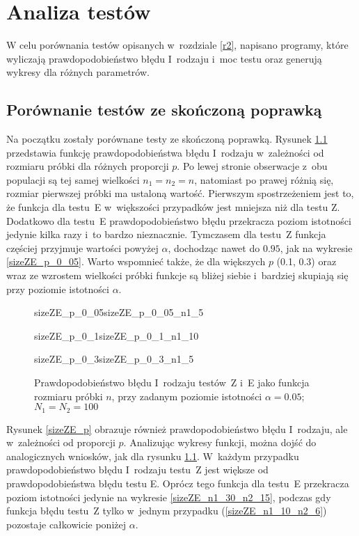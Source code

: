 \chapter{Analiza testów}
\label{r3}

W celu porównania testów opisanych w~rozdziale \ref{r2}, napisano programy, które wyliczają prawdopodobieństwo błędu I~rodzaju i~moc testu oraz generują wykresy dla różnych parametrów.

\section{Porównanie testów ze skończoną poprawką}
\label{r3:skonczonetesty}
Na początku zostały porównane testy ze skończoną poprawką. Rysunek \ref{sizeZE_n} przedstawia funkcję prawdopodobieństwa błędu I~rodzaju w~zależności od rozmiaru próbki dla różnych proporcji $p$. Po lewej stronie obserwacje z~obu populacji są tej samej wielkości $n_1=n_2=n$, natomiast po prawej różnią się, rozmiar pierwszej próbki ma ustaloną wartość. Pierwszym spostrzeżeniem jest to, że funkcja dla testu~E w~większości przypadków jest mniejsza niż dla testu Z. Dodatkowo dla testu~E prawdopodobieństwo błędu przekracza poziom istotności jedynie kilka razy i~to bardzo nieznacznie. Tymczasem dla testu~Z funkcja częściej przyjmuje wartości powyżej $\alpha$, dochodząc nawet do $0.95$, jak na wykresie \ref{sizeZE_p_0_05}. Warto wspomnieć także, że dla większych $p$ (0.1, 0.3) oraz wraz ze wzrostem wielkości próbki funkcje są bliżej siebie i~bardziej skupiają się przy poziomie istotności $\alpha$.

\begin{figure}[!h]
	\begin{subdiagrams}{sizeZE_p_0_05}{sizeZE_p_0_05_n1_5}
	\end{subdiagrams}
	
	\begin{subdiagrams}{sizeZE_p_0_1}{sizeZE_p_0_1_n1_10}
	\end{subdiagrams}
	
	\begin{subdiagrams}{sizeZE_p_0_3}{sizeZE_p_0_3_n1_5}
	\end{subdiagrams}
	\caption{Prawdopodobieństwo błędu I~rodzaju testów~Z i~E jako funkcja rozmiaru próbki $n$, przy zadanym poziomie istotności $\alpha=0.05$; $N_1=N_2=100$}
	\label{sizeZE_n}
\end{figure}

Rysunek \ref{sizeZE_p} obrazuje również prawdopodobieństwo błędu I~rodzaju, ale w~zależności od proporcji $p$. Analizując wykresy funkcji, można dojść do analogicznych wniosków, jak dla rysunku \ref{sizeZE_n}. W~każdym przypadku prawdopodobieństwo błędu I~rodzaju testu~Z jest większe od prawdopodobieństwa błędu testu E. Oprócz tego funkcja dla testu~E przekracza poziom istotności jedynie na wykresie \ref{sizeZE_n1_30_n2_15}, podczas gdy funkcja błędu testu~Z tylko w~jednym przypadku (\ref{sizeZE_n1_10_n2_6}) pozostaje całkowicie poniżej $\alpha$.

